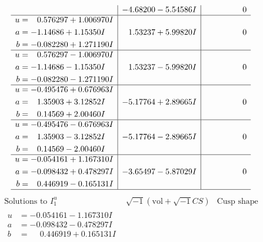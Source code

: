 \documentclass[1p]{elsarticle_modified}
\theoremstyle{definition}
\newcommand{\I}{\sqrt{-1}}
\begin{document}
$$\begin{array}{c|c|c}
 & -4.68200 - 5.54586 I & \phantom{-0.000000 } 0 \\ \hline\begin{aligned}
u &= \phantom{-}0.576297 + 1.006970 I \\
a &= -1.14686 + 1.15350 I \\
b &= -0.082280 + 1.271190 I\end{aligned}
 & \phantom{-}1.53237 + 5.99820 I & \phantom{-0.000000 } 0 \\ \hline\begin{aligned}
u &= \phantom{-}0.576297 - 1.006970 I \\
a &= -1.14686 - 1.15350 I \\
b &= -0.082280 - 1.271190 I\end{aligned}
 & \phantom{-}1.53237 - 5.99820 I & \phantom{-0.000000 } 0 \\ \hline\begin{aligned}
u &= -0.495476 + 0.676963 I \\
a &= \phantom{-}1.35903 + 3.12852 I \\
b &= \phantom{-}0.14569 + 2.00460 I\end{aligned}
 & -5.17764 + 2.89665 I & \phantom{-0.000000 } 0 \\ \hline\begin{aligned}
u &= -0.495476 - 0.676963 I \\
a &= \phantom{-}1.35903 - 3.12852 I \\
b &= \phantom{-}0.14569 - 2.00460 I\end{aligned}
 & -5.17764 - 2.89665 I & \phantom{-0.000000 } 0 \\ \hline\begin{aligned}
u &= -0.054161 + 1.167310 I \\
a &= -0.098432 + 0.478297 I \\
b &= \phantom{-}0.446919 - 0.165131 I\end{aligned}
 & -3.65497 - 5.87029 I & \phantom{-0.000000 } 0\\
 \hline 
 \end{array}$$\newpage$$\begin{array}{c|c|c}  
\text{Solutions to }I^u_{1}& \I (\text{vol} + \sqrt{-1}CS) & \text{Cusp shape}\\
 \hline 
\begin{aligned}
u &= -0.054161 - 1.167310 I \\
a &= -0.098432 - 0.478297 I \\
b &= \phantom{-}0.446919 + 0.165131 I\end{aligned}

\end{array}$$
\end{document}
